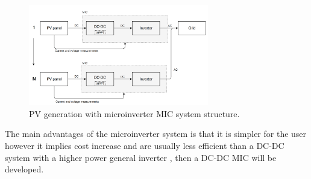 \begin{figure}[H]
	\begin{center}
		\includegraphics[width=0.7\textwidth]{../Pictures/MIC_microinverter}
		\caption{PV generation with microinverter MIC system structure.}
		\label{microinverter_system}
	\end{center}	
\end{figure}
The main advantages of the microinverter system is that it is simpler for the user however it implies cost increase and are usually less efficient than a DC-DC system with a higher power general inverter \cite{ArchitectureMIC}, then a DC-DC MIC will be developed. 


